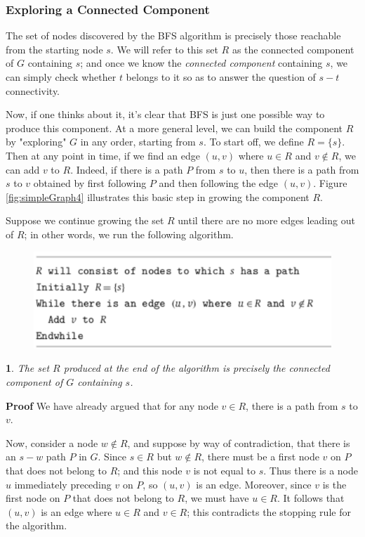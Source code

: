 \documentclass[12pt,a4paper]{book}
\newtheorem{lemma}{}[chapter]
\begin{document}
\subsubsection{Exploring a Connected Component}
The set of nodes discovered by the BFS algorithm is precisely those reachable from the starting node $s$. We will refer to this set $R$ as the connected component of $G$ containing $s$; and once we know the \textit{connected component} containing $s$, we can simply check whether $t$ belongs to it so as to answer the question of $s-t$ connectivity.\par
Now, if one thinks about it, it's clear that BFS is just one possible way to produce this component. At a more general level, we can build the component $R$ by "exploring" $G$ in any order, starting from $s$. To start off, we define $R = \{s\}$. Then at any point in time, if we find an edge $(u, v)$ where $u \in R$ and $v \notin R$, we can add $v$ to $R$. Indeed, if there is a path $P$ from $s$ to $u$, then there is a path from $s$ to $v$ obtained by first following $P$ and then following the edge $(u, v)$. Figure \ref{fig:simpleGraph4} illustrates this basic step in growing the component $R$.\par
Suppose we continue growing the set $R$ until there are no more edges leading out of $R$; in other words, we run the following algorithm.
\begin{figure}[h]
    \centering
    \includegraphics[width=\textwidth]{simpleGraph5}
\end{figure}
\begin{lemma}
The set $R$ produced at the end of the algorithm is precisely the connected component of $G$ containing $s$.
\end{lemma}
\textbf{Proof} We have already argued that for any node $v \in R$, there is a path from $s$ to $v$.\par
Now, consider a node $w \notin R$, and suppose by way of contradiction, that there is an $s-w$ path $P$ in $G$. Since $s \in R$ but $w \notin  R$, there must be a first node $v$ on $P$ that does not belong to $R$; and this node $v$ is not equal to $s$. Thus there is a node $u$ immediately preceding $v$ on $P$, so $(u, v)$ is an edge. Moreover, since $v$ is the first node on $P$ that does not belong to $R$, we must have $u \in R$. It follows that $(u, v)$ is an edge where $u \in R$ and $v \in R$; this contradicts the stopping rule for the algorithm.\par
\end{document}

